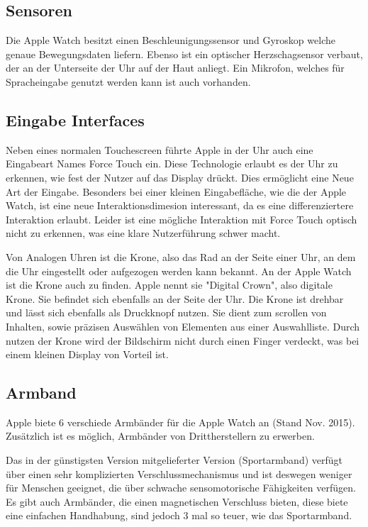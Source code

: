 \subsection{Sensoren}
Die Apple Watch besitzt einen Beschleunigungssensor und Gyroskop welche genaue Bewegungsdaten liefern. Ebenso ist ein optischer Herzschagsensor verbaut, der an der Unterseite der Uhr auf der Haut anliegt. Ein Mikrofon, welches für Spracheingabe genutzt werden kann ist auch vorhanden.
\subsection{Eingabe Interfaces}
\label{ch:eingabe_interface}
Neben eines normalen Touchescreen führte Apple in der Uhr auch eine Eingabeart Names Force Touch ein. Diese Technologie erlaubt es der Uhr zu erkennen, wie fest der Nutzer auf das Display drückt. Dies ermöglicht eine Neue Art der Eingabe. Besonders bei einer kleinen Eingabefläche, wie die der Apple Watch, ist eine neue Interaktionsdimesion interessant, da es eine differenziertere Interaktion erlaubt. Leider ist eine mögliche Interaktion mit Force Touch optisch nicht zu erkennen, was eine klare Nutzerführung schwer macht.

 Von Analogen Uhren ist die Krone, also das Rad an der Seite einer Uhr, an dem die Uhr eingestellt oder aufgezogen werden kann bekannt. An der Apple Watch ist die Krone auch zu finden. Apple nennt sie "Digital Crown", also digitale Krone. Sie befindet sich ebenfalls an der Seite der Uhr. Die Krone ist drehbar und lässt sich ebenfalls als Druckknopf nutzen. Sie dient zum scrollen von Inhalten, sowie präzisen Auswählen von Elementen aus einer Auswahlliste. Durch nutzen der Krone wird der Bildschirm nicht durch einen Finger verdeckt, was bei einem kleinen Display von Vorteil ist.
\subsection{Armband}
Apple biete 6 verschiede Armbänder für die Apple Watch an (Stand Nov. 2015). Zusätzlich ist es möglich, Armbänder von Drittherstellern zu erwerben. 

Das in der günstigsten Version mitgelieferter Version (Sportarmband) verfügt über einen sehr komplizierten Verschlussmechanismus und ist deswegen weniger für Menschen geeignet, die über schwache sensomotorische Fähigkeiten verfügen. Es gibt auch Armbänder, die einen magnetischen Verschluss bieten, diese biete eine einfachen Handhabung, sind jedoch 3 mal so teuer, wie das Sportarmband.


